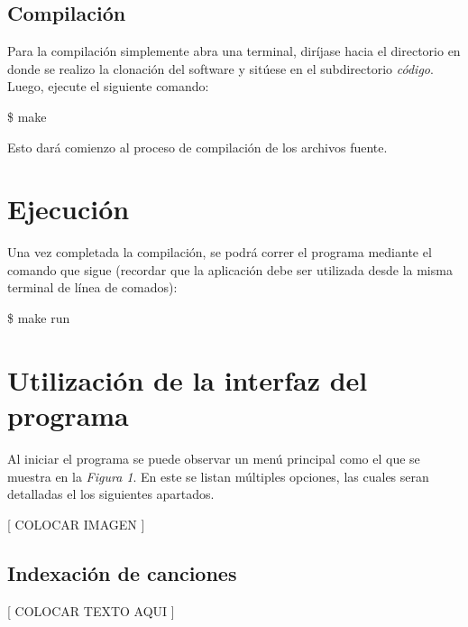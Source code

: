 \documentclass{article}
\begin{document}
\subsection{Compilación}

	Para la compilación simplemente abra una terminal, diríjase hacia el directorio en donde se realizo la clonación del software y sitúese en el subdirectorio \textit{código}. Luego, ejecute el siguiente comando:
	\bigskip

	\colorbox{gray95}{{\ttfamily\footnotesize
	\$ make\\}}
	\medskip

	Esto dará comienzo al proceso de compilación de los archivos fuente.
\bigskip\medskip




\section{Ejecución}

	Una vez completada la compilación, se podrá correr el programa mediante el comando que sigue (recordar que la aplicación debe ser utilizada desde la misma terminal de línea de comados):
	\bigskip

	\colorbox{gray95}{{\ttfamily\footnotesize
	\$ make run\\}}
	\medskip



\section{Utilización de la interfaz del programa}

	Al iniciar el programa se puede observar un menú principal como el que se muestra en la \textit{Figura 1}. En este se listan múltiples opciones, las cuales seran detalladas el los siguientes apartados.
	\bigskip

	[ COLOCAR IMAGEN ]
	\bigskip



\subsection{Indexación de canciones}

	[ COLOCAR TEXTO AQUI ]
\bigskip



\end{document}
